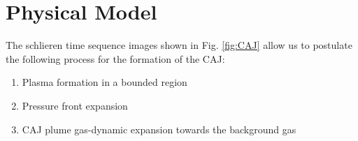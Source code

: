 \documentclass[a4paper]{iacas}%
\begin{document}
%
%
%
%
%

\section{Physical Model}\label{sec:physical_model}
The schlieren time sequence images shown in Fig. \ref{fig:CAJ} allow us to postulate the following process for the formation of the CAJ:
\begin{enumerate}
	\item Plasma formation in a bounded region
	\item Pressure front expansion
	\item CAJ plume gas-dynamic expansion towards the background gas
\end{enumerate}
\end{document}
